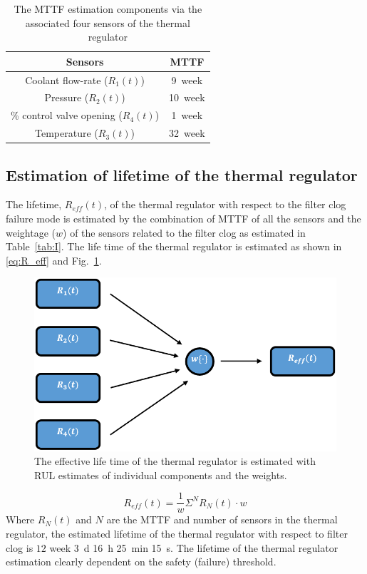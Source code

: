 \documentclass[conference]{IEEEtran}
\begin{document}
\begin{table}[htbp]
    \caption{The MTTF estimation components via the associated four sensors of the thermal regulator}
    \begin{center}
        \begin{tabular}{|c|c|}
            \hline
            \textbf{Sensors}& \textbf{MTTF} \\
            \hline
            Coolant flow-rate ($R_1(t)$) & \num{9}~week  \\
            \hline
            Pressure ($R_2(t)$) & \num{10}~week \\
            \hline
            \% control valve opening ($R_4(t)$) & \num{1}~week \\
            \hline
            Temperature ($R_3(t)$) & \num{32}~week \\
            \hline
        \end{tabular}
        \label{tab:III}
    \end{center}
\end{table}

\subsection{Estimation of lifetime of the thermal regulator}
\label{subsec:Lifetime}
The lifetime, $R_{eff} (t)$, of the thermal regulator with respect to the filter clog failure mode is estimated by the combination of MTTF of all the sensors and the weightage ($w$) of the sensors related to the filter clog as estimated in Table~\ref{tab:I}. The life time of the thermal regulator is estimated as shown in \eqref{eq:R_eff} and Fig.~\ref{fig:R_eff}.
\begin{figure}[htbp]
\centerline{\includegraphics[width=\linewidth]{R_eff.png}}
\caption{The effective life time of the thermal regulator is estimated with RUL estimates of individual components and the weights.}
\label{fig:R_eff}
\end{figure}
\begin{equation}
    R_{eff}(t) = \frac{1}{w}\Sigma^N R_N(t)\cdot w
    \label{eq:R_eff}
\end{equation}
Where $R_N (t)$ and $N$ are the MTTF and number of sensors in the thermal regulator, the estimated lifetime of the thermal regulator with respect to filter clog is $12$ week \SI{3}{\day} \SI{16}{\hour} \SI{25}{\minute} \SI{15}{\second}. The lifetime of the thermal regulator estimation clearly dependent on the safety (failure) threshold.
\end{document}
